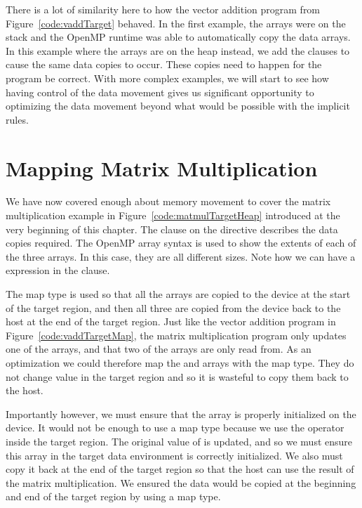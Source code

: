 There is a lot of similarity here to how the vector addition program from Figure~\ref{code:vaddTarget} behaved.
In the first example, the arrays were on the stack and the OpenMP runtime was able to automatically copy the data arrays.
In this example where the arrays are on the heap instead, we add the  clauses to cause the same data copies to occur.
These copies need to happen for the program be correct.
With more complex examples, we will start to see how having control of the data movement gives us significant opportunity to optimizing the data movement beyond what would be possible with the implicit rules.

\section{Mapping Matrix Multiplication}
We have now covered enough about memory movement to cover the matrix multiplication example in Figure~\ref{code:matmulTargetHeap} introduced at the very beginning of this chapter.
The  clause on the  directive describes the data copies required.
The OpenMP array syntax is used to show the extents of each of the three arrays.
In this case, they are all different sizes. Note how we can have a expression in the clause.

The  map type is used so that all the arrays are copied to the device at the start of the target region, and then all three are copied from the device back to the host at the end of the target region.
Just like the vector addition program in Figure~\ref{code:vaddTargetMap}, the matrix multiplication program only updates one of the arrays, and that two of the arrays are only read from.
As an optimization we could therefore map the  and  arrays with the  map type.
They do not change value in the target region and so it is wasteful to copy them back to the host.

Importantly however, we must ensure that the  array is properly initialized on the device.
It would not be enough to use a  map type because we use the \Code{+=} operator inside the target region.
The original value of  is updated, and so we must ensure this array in the target data environment is correctly initialized.
We also must copy it back at the end of the target region so that the host can use the result of the matrix multiplication.
We ensured the data would be copied at the beginning and end of the target region by using a  map type.

